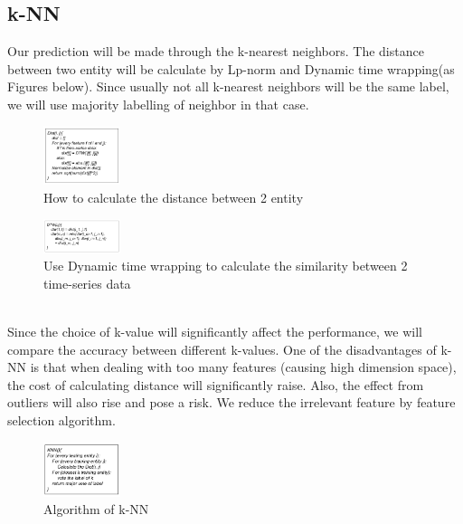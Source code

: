 \documentclass[acmtog, authorversion]{acmart}
\begin{document}
\subsection{k-NN}
Our prediction will be made through the k-nearest neighbors. The distance between two entity will be calculate by Lp-norm and Dynamic time wrapping(as Figures below). Since usually not all k-nearest neighbors will be the same label, we will use majority labelling of neighbor in that case. 
\begin{figure}[h!]
  \centering
  \includegraphics[width=0.2\textwidth]{dist}
  \caption{How to calculate the distance between 2 entity}
  \end{figure}
\begin{figure}[h!]
  \centering
  \includegraphics[width=0.2\textwidth]{dtw}
  \caption{Use Dynamic time wrapping to calculate the similarity between 2 time-series data}
  \end{figure}
\\Since the choice of k-value will significantly affect the performance, we will compare the accuracy between different k-values. One of the disadvantages of k-NN is that when dealing with too many features (causing high dimension space), the cost of calculating distance will significantly raise. Also, the effect from outliers will also rise and pose a risk. We reduce the irrelevant feature by feature selection algorithm.
\begin{figure}[h!]
  \centering
  \includegraphics[width=0.2\textwidth]{knn}
  \caption{Algorithm of k-NN}
  \end{figure}
  
\end{document}
